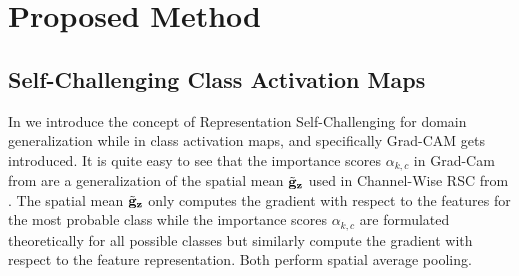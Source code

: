 \newcommand{\rsc}{\textsc{RSC}\xspace}
\newcommand{\scam}{\textsc{SCAM}\xspace}
\newcommand{\scamb}{\textsc{SCAM-B}\xspace}
\newcommand{\scambs}{\textsc{SCAM-BS}\xspace}
\newcommand{\scamdb}{\textsc{SCAM-DB}\xspace}
\newcommand{\scamdbs}{\textsc{SCAM-DBS}\xspace}
\newcommand{\scamc}{\textsc{SCAM-C}\xspace}
\newcommand{\scamcs}{\textsc{SCAM-CS}\xspace}
\newcommand{\scamdc}{\textsc{SCAM-DC}\xspace}
\newcommand{\scamdcs}{\textsc{SCAM-DCS}\xspace}
\newcommand{\scamt}{\textsc{SCAM-T}\xspace}
\newcommand{\scamts}{\textsc{SCAM-TS}\xspace}
\newcommand{\scamdt}{\textsc{SCAM-DT}\xspace}
\newcommand{\scamdts}{\textsc{SCAM-DTS}\xspace}

\chapter{Proposed Method}

\section{Self-Challenging Class Activation Maps}
In  we introduce the concept of Representation Self-Challenging for domain generalization while in  class activation maps, and specifically Grad-CAM gets introduced. It is quite easy to see that the importance scores $\alpha_{k,c}$ in Grad-Cam from  are a generalization of the spatial mean $\Tilde{\mathbf{g}}_\mathbf{z}$ used in Channel-Wise RSC from . The spatial mean $\Tilde{\mathbf{g}}_\mathbf{z}$ only computes the gradient with respect to the features for the most probable class while the importance scores $\alpha_{k,c}$ are formulated theoretically for all possible classes but similarly compute the gradient with respect to the feature representation. Both perform spatial average pooling.  

